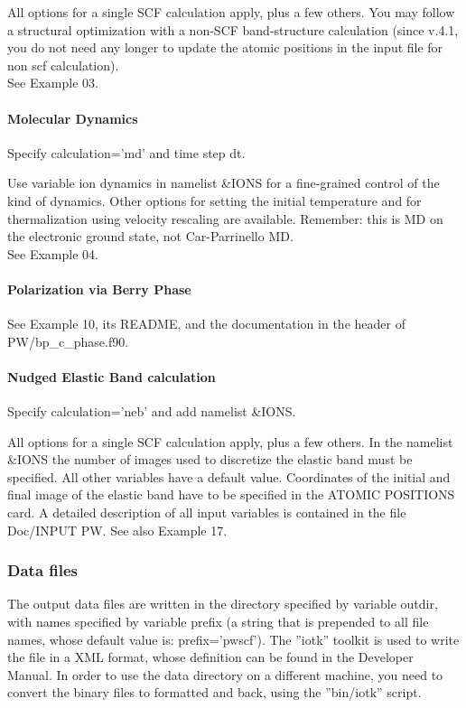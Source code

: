 \documentclass[12pt,a4paper]{article}
\begin{document}
All options for a single SCF calculation apply, plus a few others. You
may follow a structural optimization with a non-SCF band-structure
calculation (since v.4.1, you do not need any longer to update the 
atomic positions in the input file for non scf calculation).\\
See Example 03.

\paragraph{Molecular Dynamics} 
Specify calculation='md' and time step dt.

Use variable ion dynamics in namelist \&IONS for a fine-grained control
of the kind of dynamics. Other options for setting the initial
temperature and for thermalization using velocity rescaling are
available. Remember: this is MD on the electronic ground state, not
Car-Parrinello MD.\\
See Example 04.

\paragraph{Polarization via Berry Phase}
See Example 10, its README, and the documentation in the header of
PW/bp\_c\_phase.f90. 

\paragraph{Nudged Elastic Band calculation}
Specify calculation='neb' and add namelist \&IONS.

All options for a single SCF calculation apply, plus a few others. In the
namelist \&IONS the number of images used to discretize the elastic band
must be specified. All other variables have a default value. Coordinates
of the initial and final image of the elastic band have to be specified
in the ATOMIC POSITIONS card. A detailed description of all input
variables is contained in the file Doc/INPUT PW. See also Example 17.

\subsubsection{Data files}

The output data files are written in the directory specified by variable
outdir, with names specified by variable prefix (a string that is prepended
to all file names, whose default value is: prefix='pwscf'). The ''iotk''
toolkit is used to write the file in a XML format, whose definition can
be found in the Developer Manual. In order to use the data directory
on a different machine, you need to convert the binary files to formatted
and back, using the ''bin/iotk'' script.
\end{document}
